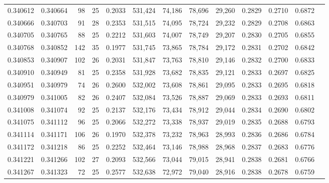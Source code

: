 \begin{tabular}{rrrrrrrrrrrrr}
0.340612 & 0.340664 &    98 &  25 &                                     0.2033 & 531,424 &  74,186 &  78,696 &  29,260 & 0.2829 & 0.2710 & 0.6872 \\
0.340666 & 0.340703 &    91 &  28 &                                     0.2353 & 531,515 &  74,095 &  78,724 &  29,232 & 0.2829 & 0.2708 & 0.6863 \\
0.340705 & 0.340765 &    88 &  25 &                                     0.2212 & 531,603 &  74,007 &  78,749 &  29,207 & 0.2830 & 0.2705 & 0.6855 \\
0.340768 & 0.340852 &   142 &  35 &                                     0.1977 & 531,745 &  73,865 &  78,784 &  29,172 & 0.2831 & 0.2702 & 0.6842 \\
0.340853 & 0.340907 &   102 &  26 &                                     0.2031 & 531,847 &  73,763 &  78,810 &  29,146 & 0.2832 & 0.2700 & 0.6833 \\
0.340910 & 0.340949 &    81 &  25 &                                     0.2358 & 531,928 &  73,682 &  78,835 &  29,121 & 0.2833 & 0.2697 & 0.6825 \\
0.340951 & 0.340979 &    74 &  26 &                                     0.2600 & 532,002 &  73,608 &  78,861 &  29,095 & 0.2833 & 0.2695 & 0.6818 \\
0.340979 & 0.341005 &    82 &  26 &                                     0.2407 & 532,084 &  73,526 &  78,887 &  29,069 & 0.2833 & 0.2693 & 0.6811 \\
0.341008 & 0.341074 &    92 &  25 &                                     0.2137 & 532,176 &  73,434 &  78,912 &  29,044 & 0.2834 & 0.2690 & 0.6802 \\
0.341075 & 0.341112 &    96 &  25 &                                     0.2066 & 532,272 &  73,338 &  78,937 &  29,019 & 0.2835 & 0.2688 & 0.6793 \\
0.341114 & 0.341171 &   106 &  26 &                                     0.1970 & 532,378 &  73,232 &  78,963 &  28,993 & 0.2836 & 0.2686 & 0.6784 \\
0.341172 & 0.341218 &    86 &  25 &                                     0.2252 & 532,464 &  73,146 &  78,988 &  28,968 & 0.2837 & 0.2683 & 0.6776 \\
0.341221 & 0.341266 &   102 &  27 &                                     0.2093 & 532,566 &  73,044 &  79,015 &  28,941 & 0.2838 & 0.2681 & 0.6766 \\
0.341267 & 0.341323 &    72 &  25 &                                     0.2577 & 532,638 &  72,972 &  79,040 &  28,916 & 0.2838 & 0.2678 & 0.6759 \\

\end{tabular}
